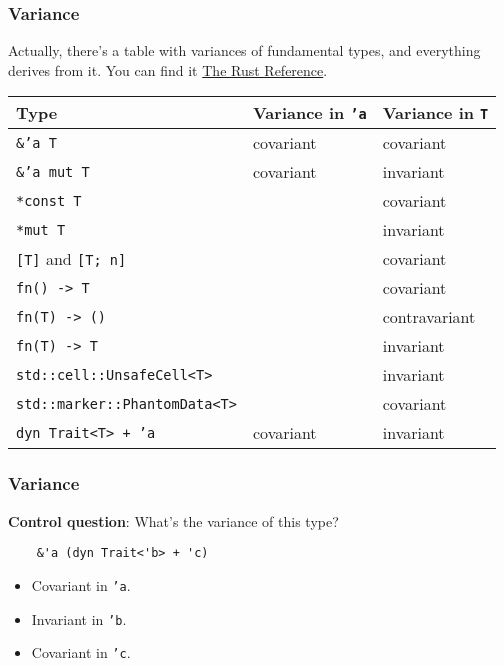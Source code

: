 \documentclass[aspectratio=1610,t]{beamer}
\begin{document}
\begin{frame}[fragile]
\frametitle{Variance}
Actually, there's a table with variances of fundamental types, and everything derives from it. You can find it \href{https://doc.rust-lang.org/reference/subtyping.html#variance}{The Rust Reference}.

\begin{table}[]
\begin{tabular}{|l|l|l|}
\hline
Type                                 & Variance in \texttt{'a} & Variance in \texttt{T} \\ \hline
\texttt{\&'a T}                      & covariant               & covariant              \\ \hline
\texttt{\&'a mut T}                  & covariant               & invariant              \\ \hline
\texttt{*const T}                    &                         & covariant              \\ \hline
\texttt{*mut T}                      &                         & invariant              \\ \hline
\texttt{[T]} and \texttt{[T; n]}     &                         & covariant              \\ \hline
\texttt{fn() -> T}                   &                         & covariant              \\ \hline
\texttt{fn(T) -> ()}                 &                         & contravariant          \\ \hline
\texttt{fn(T) -> T}                  &                         & invariant              \\ \hline
\texttt{std::cell::UnsafeCell<T>}    &                         & invariant              \\ \hline
\texttt{std::marker::PhantomData<T>} &                         & covariant              \\ \hline
\texttt{dyn Trait<T> + 'a}           & covariant               & invariant              \\ \hline
\end{tabular}
\end{table}
\end{frame}


\begin{frame}[fragile]
\frametitle{Variance}
\textbf{Control question}: What's the variance of this type?

\begin{verbatim}
    &'a (dyn Trait<'b> + 'c)
\end{verbatim}

\begin{itemize}
    \item<2-> Covariant in \texttt{'a}.
    \item<3-> Invariant in \texttt{'b}.
    \item<4-> Covariant in \texttt{'c}.
\end{itemize}
\end{frame}
\end{document}
